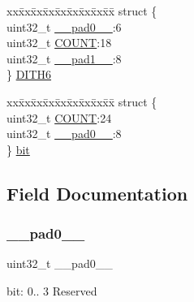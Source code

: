 \begin{DoxyCompactItemize}
\begin{tabbing}
\end{tabbing}\item 
\begin{tabbing}
xx\=xx\=xx\=xx\=xx\=xx\=xx\=xx\=xx\=\kill
struct \{\\
\>uint32\_t \mbox{\hyperlink{union_t_c_c___c_o_u_n_t___type_a3e57c2ef1c3ffb36722f000cc1156824}{\_\_pad0\_\_}}:6\\
\>uint32\_t \mbox{\hyperlink{union_t_c_c___c_o_u_n_t___type_aa9f8906e3d27dfbf12691127c9bb88ba}{COUNT}}:18\\
\>uint32\_t \mbox{\hyperlink{union_t_c_c___c_o_u_n_t___type_a6712ba6dd1d5b43d2d56ff8ac4e275a7}{\_\_pad1\_\_}}:8\\
\} \mbox{\hyperlink{union_t_c_c___c_o_u_n_t___type_a45cbfa4ced52916c3eb023e920cc0015}{DITH6}}\\

\end{tabbing}\item 
\begin{tabbing}
xx\=xx\=xx\=xx\=xx\=xx\=xx\=xx\=xx\=\kill
struct \{\\
\>uint32\_t \mbox{\hyperlink{union_t_c_c___c_o_u_n_t___type_aa9f8906e3d27dfbf12691127c9bb88ba}{COUNT}}:24\\
\>uint32\_t \mbox{\hyperlink{union_t_c_c___c_o_u_n_t___type_a3e57c2ef1c3ffb36722f000cc1156824}{\_\_pad0\_\_}}:8\\
\} \mbox{\hyperlink{union_t_c_c___c_o_u_n_t___type_a35d4036e10afe4132bd68974aeb8aa36}{bit}}\\

\end{tabbing}\end{DoxyCompactItemize}


\subsection{Field Documentation}
\mbox{\label{union_t_c_c___c_o_u_n_t___type_a3e57c2ef1c3ffb36722f000cc1156824}} 
\subsubsection{\texorpdfstring{\_\_pad0\_\_}{\_\_pad0\_\_}}
{\footnotesize\ttfamily uint32\+\_\+t \+\_\+\+\_\+pad0\+\_\+\+\_\+}

bit\+: 0.. 3 Reserved

